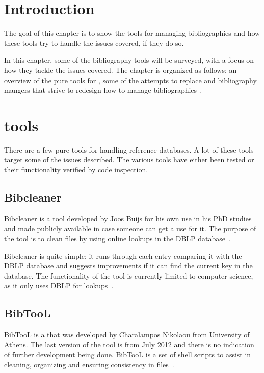 \section{Introduction}
The goal of this chapter is to show the tools for managing
bibliographies and how these tools try to handle the issues covered,
if they do so.

In this chapter, some of the bibliography tools will be surveyed, with
a focus on how they tackle the issues covered.  The chapter is
organized as follows: an overview of the pure tools for {\bibtex}
, some of the attempts to replace {\bibtex}
 and bibliography mangers that strive
to redesign how to manage bibliographies
.


\section{{\bibtex} tools}
\label{sec:bibtex_tools}
There are a few pure {\bibtex} tools for handling reference databases.
A lot of these tools target some of the issues described.  The
various tools have either been tested or their functionality verified
by code inspection.

\subsection{Bibcleaner}
Bibcleaner is a tool developed by Joos Buijs for his own use in his
PhD studies and made publicly available in case someone can get a use
for it.  The purpose of the tool is to clean {\bibtex} files by using
online lookups in the DBLP database~\cite{bibcleaner_question,
  bibcleaner_source}.

Bibcleaner is quite simple: it runs through each entry comparing it
with the DBLP database and suggests improvements if it can find the
current key in the database.  The functionality of the tool is
currently limited to computer science, as it only uses DBLP for
lookups~\cite{bibcleaner_source}.

\subsection{BibTooL}
BibTooL is a {\bibtex} that was developed by Charalampos Nikolaou from
University of Athens.  The last version of the tool is from July 2012
and there is no indication of further development being done.  BibTooL
is a set of shell scripts to assist in cleaning, organizing and
ensuring consistency in {\bibtex} files~\cite{bibtool_site}.


